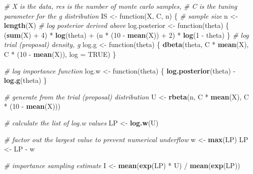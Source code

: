 \documentclass[]{article}
\newenvironment{Shaded}{\begin{snugshade}}{\end{snugshade}}
\newcommand{\KeywordTok}[1]{\textcolor[rgb]{0.13,0.29,0.53}{\textbf{{#1}}}}
\newcommand{\DataTypeTok}[1]{\textcolor[rgb]{0.13,0.29,0.53}{{#1}}}
\newcommand{\DecValTok}[1]{\textcolor[rgb]{0.00,0.00,0.81}{{#1}}}
\newcommand{\StringTok}[1]{\textcolor[rgb]{0.31,0.60,0.02}{{#1}}}
\newcommand{\CommentTok}[1]{\textcolor[rgb]{0.56,0.35,0.01}{\textit{{#1}}}}
\newcommand{\OtherTok}[1]{\textcolor[rgb]{0.56,0.35,0.01}{{#1}}}
\newcommand{\NormalTok}[1]{{#1}}
\begin{document}
\begin{Shaded}
\begin{Highlighting}[]
\CommentTok{# X is the data, res is the number of monte carlo samples,}
\CommentTok{# C is the tuning parameter for the g distribution}
\NormalTok{IS <-}\StringTok{ }\NormalTok{function(X, C, n)}
\NormalTok{\{}
  \CommentTok{# sample size}
  \NormalTok{n <-}\StringTok{ }\KeywordTok{length}\NormalTok{(X)}
  \CommentTok{# log posterior derived above}
  \NormalTok{log.posterior <-}\StringTok{  }\NormalTok{function(theta) \{}
    \NormalTok{(}\KeywordTok{sum}\NormalTok{(X) +}\StringTok{ }\DecValTok{4}\NormalTok{) *}\StringTok{ }\KeywordTok{log}\NormalTok{(theta) +}\StringTok{ }\NormalTok{(n *}\StringTok{ }\NormalTok{(}\DecValTok{10} \NormalTok{-}\StringTok{ }\KeywordTok{mean}\NormalTok{(X)) +}\StringTok{ }\DecValTok{2}\NormalTok{) *}\StringTok{ }\KeywordTok{log}\NormalTok{(}\DecValTok{1} \NormalTok{-}\StringTok{ }\NormalTok{theta)}
  \NormalTok{\}}
  \CommentTok{# log trial (proposal) density, g}
  \NormalTok{log.g <-}\StringTok{ }\NormalTok{function(theta) \{}
    \KeywordTok{dbeta}\NormalTok{(theta, C *}\StringTok{ }\KeywordTok{mean}\NormalTok{(X), C *}\StringTok{ }\NormalTok{(}\DecValTok{10} \NormalTok{-}\StringTok{ }\KeywordTok{mean}\NormalTok{(X)), }\DataTypeTok{log =} \OtherTok{TRUE}\NormalTok{)}
  \NormalTok{\}}
  
  \CommentTok{# log importance function}
  \NormalTok{log.w <-}\StringTok{ }\NormalTok{function(theta) \{}
    \KeywordTok{log.posterior}\NormalTok{(theta) -}\StringTok{ }\KeywordTok{log.g}\NormalTok{(theta)}
  \NormalTok{\}}
  
  \CommentTok{# generate from the trial (proposal) distribution}
  \NormalTok{U <-}\StringTok{ }\KeywordTok{rbeta}\NormalTok{(n, C *}\StringTok{ }\KeywordTok{mean}\NormalTok{(X), C *}\StringTok{ }\NormalTok{(}\DecValTok{10} \NormalTok{-}\StringTok{ }\KeywordTok{mean}\NormalTok{(X)))}
  
  \CommentTok{# calculate the list of log.w values}
  \NormalTok{LP <-}\StringTok{ }\KeywordTok{log.w}\NormalTok{(U)}
  
  \CommentTok{# factor out the largest value to prevent numerical underflow}
  \NormalTok{w <-}\StringTok{ }\KeywordTok{max}\NormalTok{(LP)}
  \NormalTok{LP <-}\StringTok{ }\NormalTok{LP -}\StringTok{ }\NormalTok{w}
  
  \CommentTok{# importance sampling estimate}
  \NormalTok{I <-}\StringTok{ }\KeywordTok{mean}\NormalTok{(}\KeywordTok{exp}\NormalTok{(LP) *}\StringTok{ }\NormalTok{U) /}\StringTok{ }\KeywordTok{mean}\NormalTok{(}\KeywordTok{exp}\NormalTok{(LP))}
  

\end{Highlighting}
\end{Shaded}
\end{document}

